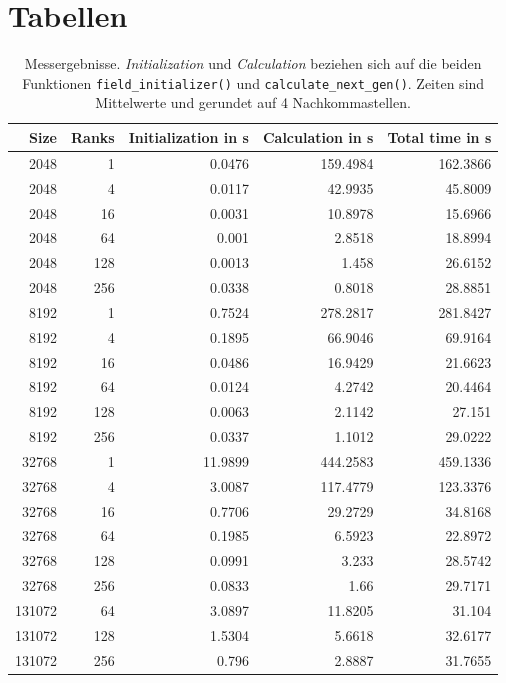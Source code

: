 \documentclass[german,plainarticle,hyperref,utf8]{zihpub}
\begin{document}
	\section{Tabellen} \label{tables}
	\begin{table}[h]
		\centering
			\begin{tabular}{|| r r r r r ||}
				\hline
				Size & Ranks & Initialization in s & Calculation in s & Total time in s \\ [1ex]
				\hline\hline
				2048 & 1 & 0.0476 & 159.4984 & 162.3866 \\ \hline
				2048 & 4 & 0.0117 & 42.9935 & 45.8009 \\ \hline
				2048 & 16 & 0.0031 & 10.8978 & 15.6966 \\ \hline
				2048 & 64 & 0.001 & 2.8518 & 18.8994 \\ \hline
				2048 & 128 & 0.0013 & 1.458 & 26.6152 \\ \hline
				2048 & 256 & 0.0338 & 0.8018 & 28.8851 \\ \hline \hline
				8192 & 1 & 0.7524 & 278.2817 & 281.8427 \\ \hline
				8192 & 4 & 0.1895 & 66.9046 & 69.9164 \\ \hline
				8192 & 16 & 0.0486 & 16.9429 & 21.6623 \\ \hline
				8192 & 64 & 0.0124 & 4.2742 & 20.4464 \\ \hline
				8192 & 128 & 0.0063 & 2.1142 & 27.151 \\ \hline
				8192 & 256 & 0.0337 & 1.1012 & 29.0222 \\ \hline \hline
				32768 & 1 & 11.9899 & 444.2583 & 459.1336 \\ \hline
				32768 & 4 & 3.0087 & 117.4779 & 123.3376 \\ \hline
				32768 & 16 & 0.7706 & 29.2729 & 34.8168 \\ \hline
				32768 & 64 & 0.1985 & 6.5923 & 22.8972 \\ \hline
				32768 & 128 & 0.0991 & 3.233 & 28.5742 \\ \hline
				32768 & 256 & 0.0833 & 1.66 & 29.7171 \\ \hline \hline
				131072 & 64 & 3.0897 & 11.8205 & 31.104 \\ \hline
				131072 & 128 & 1.5304 & 5.6618 & 32.6177 \\ \hline
				131072 & 256 & 0.796 & 2.8887 & 31.7655 \\ \hline
			\end{tabular}
			\caption{Messergebnisse. \textit{Initialization} und \textit{Calculation} beziehen sich auf die beiden Funktionen \texttt{field\_initializer()} und \texttt{calculate\_next\_gen()}. Zeiten sind Mittelwerte und gerundet auf 4 Nachkommastellen.}
	\end{table}
	\clearpage
	
\end{document}
